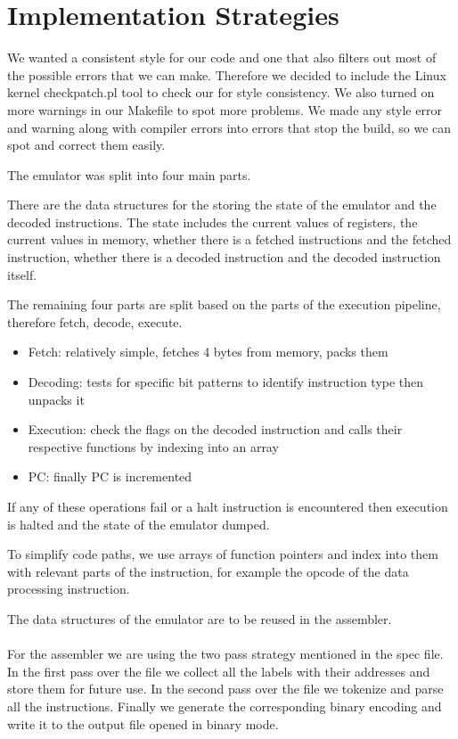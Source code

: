 \documentclass[11pt]{article}
\begin{document}
\section{Implementation Strategies}

We wanted a consistent style for our code and one that also filters out most of
the possible errors that we can make. Therefore we decided to include the Linux
kernel checkpatch.pl tool to check our for style consistency. We also turned on
more warnings in our Makefile to spot more problems. We made any style error and
warning along with compiler errors into errors that stop the build, so we can
spot and correct them easily.

The emulator was split into four main parts.

There are the data structures for the storing the state of the emulator and the
decoded instructions. The state includes the current values of registers, the
current values in memory, whether there is a fetched instructions and the
fetched instruction, whether there is a decoded instruction and the decoded
instruction itself.

The remaining four parts are split based on the parts of the execution pipeline,
therefore fetch, decode, execute.

\begin{itemize}
    \item Fetch: relatively simple, fetches 4 bytes from memory, packs them
    \item Decoding: tests for specific bit patterns to identify instruction type
      then unpacks it
    \item Execution: check the flags on the decoded instruction and calls their
      respective functions by indexing into an array
    \item PC: finally PC is incremented
\end{itemize}

If any of these operations fail or a halt instruction is encountered then
execution is halted and the state of the emulator dumped.

To simplify code paths, we use arrays of function pointers and index into them
with relevant parts of the instruction, for example the opcode of the data
processing instruction.

The data structures of the emulator are to be reused in the assembler.
\\ \\
For the assembler we are using the two pass strategy mentioned in the spec
file. In the first pass over the file we collect all the labels with their
addresses and store them for future use. In the second pass over the file
we tokenize and parse all the instructions. Finally we generate the
corresponding binary encoding and write it to the output file opened in
binary mode.
\end{document}
